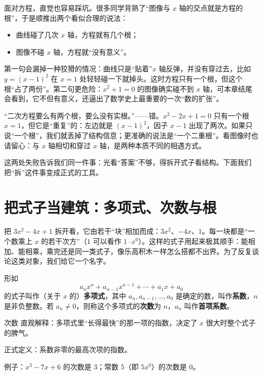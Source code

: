 面对方程，直觉也容易踩坑。很多同学背熟了“图像与 $x$ 轴的交点就是方程的根”，于是顺推出两个看似合理的说法：

\begin{itemize}
\item 曲线碰了几次 $x$ 轴，方程就有几个根；
\item 图像不碰 $x$ 轴，方程就“没有意义”。
\end{itemize}

第一句会漏掉一种狡猾的情况：曲线只是“贴着”$x$ 轴反弹，并没有穿过去，比如 $y=(x-1)^2$ 在 $x=1$ 处轻轻碰一下就掉头。这时方程只有一个根，但这个根“占了两份”。第二句更危险：$x^2+1=0$ 的图像确实碰不到 $x$ 轴，可本章结尾会看到，它不但有意义，还逼出了数学史上最重要的一次“数的扩张”。

\begin{fanli}
“二次方程要么有两个根，要么没有实根。”——错。$x^2-2x+1=0$ 只有一个根 $x=1$，但它是“重复”的：左边就是 $(x-1)^2$，因子 $x-1$ 出现了两次。如果只说“一个根”，我们就丢掉了结构信息；更准确的说法是“一个二重根”。看图像时也请留心：与 $x$ 轴相切和穿过 $x$ 轴，是两种本质不同的相遇方式。
\end{fanli}

这两处失败告诉我们同一件事：光看“答案”不够，得拆开式子看结构。下面我们把“拆”这件事变成正式的工具。

\section{把式子当建筑：多项式、次数与根}

把 $3x^2-4x+1$ 拆开看，它由若干“块”相加而成：$3x^2$、$-4x$、$1$。每一块都是“一个数乘上 $x$ 的若干次方”（$1$ 可以看作 $1\cdot x^0$）。这样的式子用起来极其顺手：能相加、能相乘，乘完还是同一类式子，像乐高积木一样怎么搭都不出界。为了反复谈论这类对象，我们给它一个名字。

\begin{dingyi}[多项式]
形如
\[
a_n x^n + a_{n-1} x^{n-1} + \cdots + a_1 x + a_0
\]
的式子叫作（关于 $x$ 的）\textbf{多项式}，其中 $a_n, a_{n-1}, \ldots, a_0$ 是确定的数，叫作\textbf{系数}，$n$ 是非负整数。若 $a_n \neq 0$，则称这个多项式的\textbf{次数}为 $n$，$a_n$ 叫作\textbf{首项系数}。
\end{dingyi}

\begin{shuyu}{次数}
直观解释：多项式里“长得最快”的那一项的指数，决定了 $x$ 很大时整个式子的脾气。

正式定义：系数非零的最高次项的指数。

例子：$x^3-7x+6$ 的次数是 $3$；常数 $5$（即 $5x^0$）的次数是 $0$。
\end{shuyu}

